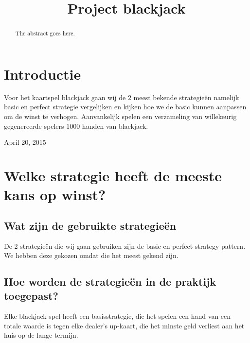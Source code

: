 \documentclass[conference]{IEEEtran}
\begin{document}
\title{Project blackjack}

\author{
}
\maketitle

\begin{abstract}
The abstract goes here.
\end{abstract}

\IEEEpeerreviewmaketitle

\section{Introductie}
Voor het kaartspel blackjack gaan wij de 2 meest bekende strategieën namelijk basic en perfect strategie vergelijken en kijken hoe we de basic kunnen aanpassen om de winst te verhogen. Aanvankelijk spelen een verzameling van willekeurig gegenereerde spelers 1000 handen van blackjack.

 
\hfill April 20, 2015

\section{Welke strategie heeft de meeste kans op winst?}

\subsection{Wat zijn de gebruikte strategieën}
De 2 strategieën die wij gaan gebruiken zijn de basic en perfect strategy pattern. We hebben deze gekozen omdat die het meest gekend zijn.

\subsection{Hoe worden de strategieën in de praktijk toegepast?}
Elke blackjack spel heeft een basisstrategie, die het spelen een hand van een totale waarde is tegen elke dealer's up-kaart, die het minste geld verliest aan het huis op de lange termijn.
\end{document}
